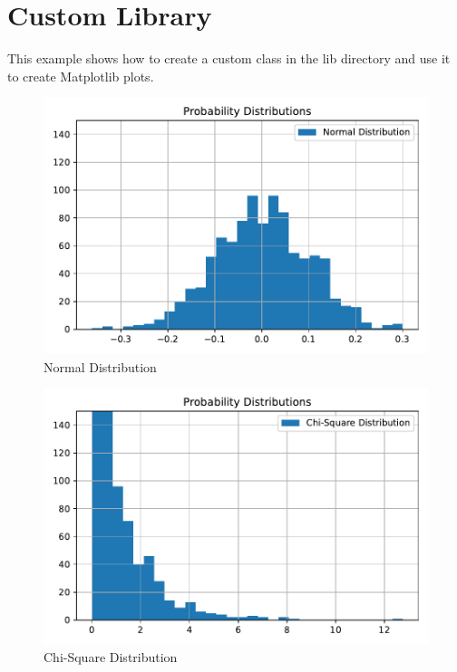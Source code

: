 \documentclass[a4paper]{book}
\begin{document}
\section{Custom Library}
\label{sec:custom-library}
This example shows how to create a custom class in the lib directory and use it to create Matplotlib plots.
\begin{figure}[H]
\begin{center}
  \includegraphics[width=\textwidth]{images/normal}
  \caption{Normal Distribution}
  \label{fig:normal}
\end{center}
\end{figure}
\begin{figure}[H]
\begin{center}
  \includegraphics[width=\textwidth]{images/chisquare}
  \caption{Chi-Square Distribution}
  \label{fig:chisquare}
\end{center}
\end{figure}
\end{document}
